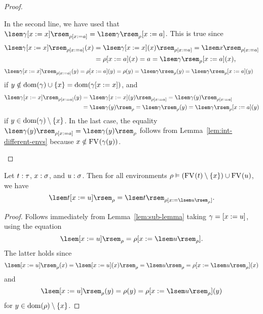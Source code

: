 \begin{lem}
\begin{proof}
\begin{items}
In the second line, we have used that $\sintsub{\updsub{\gamma}{x}{x}}{\updenv{\rho}{x}{a}} = \updenv{\sintsub{\gamma}{\rho}}{x}{a}$. This is true since
\begin{align*}
\sintsub{\updsub{\gamma}{x}{x}}{\updenv{\rho}{x}{a}}(x)
    &= \sint{\updsub{\gamma}{x}{x}(x)}{\updenv{\rho}{x}{a}}
     = \sint{x}{\updenv{\rho}{x}{a}} \\
    &= \updenv{\rho}{x}{a}(x) = a = \updenv{\sintsub{\gamma}{\rho}}{x}{a}(x),
\end{align*}
\begin{align*}
\sintsub{\updsub{\gamma}{x}{x}}{\updenv{\rho}{x}{a}}(y)
    &= \updenv{\rho}{x}{a}(y) = \rho(y)
     = \sintsub{\gamma}{\rho}(y)
     = \updenv{\sintsub{\gamma}{\rho}}{x}{a}(y)
\end{align*}
if $y \notin \dom{\gamma} \cup \singset[x] = \dom{\updsub{\gamma}{x}{x}}$, and
\begin{align*}
\sintsub{\updsub{\gamma}{x}{x}}{\updenv{\rho}{x}{a}}(y)
    &= \sint{\updsub{\gamma}{x}{x}(y)}{\updenv{\rho}{x}{a}}
     = \sint{\gamma(y)}{\updenv{\rho}{x}{a}} \\
    &= \sint{\gamma(y)}{\rho}
     = \sintsub{\gamma}{\rho}(y)
     = \updenv{\sintsub{\gamma}{\rho}}{x}{a}(y)
\end{align*}
if $y \in \dom{\gamma} \setminus \singset[x]$. In the last case, the equality $\sint{\gamma(y)}{\updenv{\rho}{x}{a}} = \sint{\gamma(y)}{\rho}$ follows from Lemma~\ref{lem:int-different-envs} because $x \notin \FV{\gamma(y)}$. \qedhere
\end{items}
\end{proof}
\end{lem}

\begin{cor} \label{cor:sub-lemma-single-var}
Let $\typedtm{t}{\tau}$, $\typedvar{x}{\sigma}$, and $\typedtm{u}{\sigma}$. Then for all environments $\typedenv{\rho}{(\FV{t} \setminus \singset[x]) \cup \FV{u}}$, we have
\[ \sint{\subst{t}{\singsubv{x}{u}}}{\rho}
    = \sint{t}{\updenv{\rho}{x}{\sint{u}{\rho}}}. \]
\begin{proof}
Follows immediately from Lemma~\ref{lem:sub-lemma} taking $\gamma = \singsubv{x}{u}$, using the equation
\[ \sintsub{\singsubv{x}{u}}{\rho} = \updenv{\rho}{x}{\sint{u}{\rho}}. \]
The latter holds since
\[ \sintsub{\singsubv{x}{u}}{\rho}(x) = \sint{\singsubv{x}{u}(x)}{\rho}
    = \sint{u}{\rho} = \updenv{\rho}{x}{\sint{u}{\rho}}(x) \]
and
\[ \sintsub{\singsubv{x}{u}}{\rho}(y) = \rho(y) = \updenv{\rho}{x}{\sint{u}{\rho}}(y) \]
for $y \in \dom{\rho} \setminus \singset[x]$.
\end{proof}
\end{cor}

